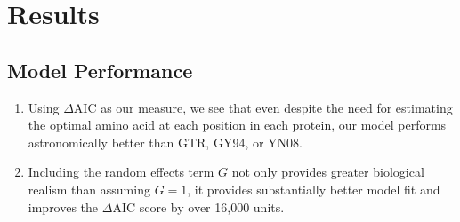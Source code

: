 \documentclass{article}
\newcommand{\DeltaAIC}{\ensuremath{\Delta\text{AIC}}\xspace}
\begin{document}
\section*{Results}
\subsection*{Model Performance}
\begin{enumerate}
\item Using \DeltaAIC as our measure, we see that even despite the need for estimating the optimal amino acid at each position in each protein, our model performs astronomically better than GTR, GY94, or YN08.
\item Including the random effects term $G$ not only provides greater biological realism than assuming $G =1$, it provides substantially better model fit and improves the \DeltaAIC score by over 16,000 units.




\end{enumerate}
\end{document}

